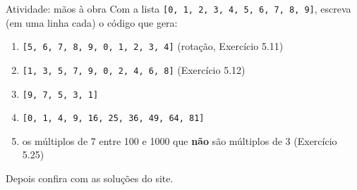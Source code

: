 \documentclass[aspectratio=169,10pt,t]{beamer}
\begin{document}
\begin{frame}{Atividade: mãos à obra}
  Com a lista \texttt{[0, 1, 2, 3, 4, 5, 6, 7, 8, 9]}, escreva (\alert{em uma linha cada}) o código que gera:
  \begin{enumerate}\small
    \item \texttt{[5, 6, 7, 8, 9, 0, 1, 2, 3, 4]} \hfill (rotação, Exercício 5.11)
    \item \texttt{[1, 3, 5, 7, 9, 0, 2, 4, 6, 8]} \hfill (Exercício 5.12)
    \item \texttt{[9, 7, 5, 3, 1]}
    \item \texttt{[0, 1, 4, 9, 16, 25, 36, 49, 64, 81]}
    \item os múltiplos de 7 entre 100 e 1000 que \textbf{não} são múltiplos de 3 \hfill (Exercício 5.25)
  \end{enumerate}
  \vspace{1ex}
  \footnotesize Depois confira com as soluções do site.
\end{frame}


\end{document}
